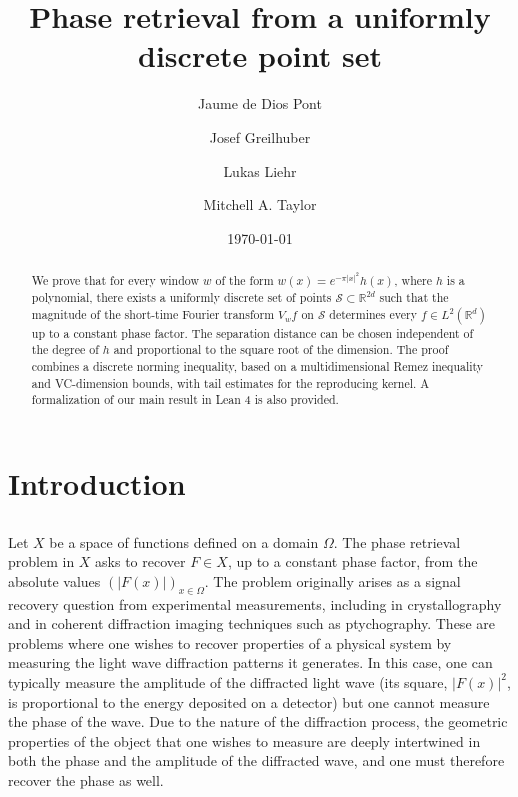 \documentclass[11pt]{amsart}
\title{Phase retrieval from a uniformly discrete point set}
\author[Jaume de Dios Pont]{Jaume de Dios Pont}
\author[Josef Greilhuber]{Josef Greilhuber}
\author[Lukas Liehr]{Lukas Liehr}
\author[Mitchell A. Taylor]{Mitchell A. Taylor}
\date{\today}
\begin{document}
\begin{abstract}
We prove that for every window $w$ of the form $w(x) = e^{-\pi |x|^2} h(x)$, where $h$ is a polynomial, there exists a uniformly discrete set of points $\mathcal{S} \subset \mathbb R^{2d}$ such that the magnitude of the short-time Fourier transform $V_w f$ on $\mathcal{S}$ determines every $f \in L^2(\mathbb R^d)$ up to a constant phase factor. The separation distance can be chosen independent of the degree of $h$ and proportional to the square root of the dimension. The proof combines a discrete norming inequality, based on a multidimensional Remez inequality and VC-dimension bounds, with tail estimates for the reproducing kernel. A formalization of our main result in Lean 4 is also provided.
\end{abstract}


\maketitle

\section{Introduction}

\label{sec:introduction}


\subsection{}


Let $X$ be a space of functions defined on a domain $\Omega$. 
The phase retrieval problem in $X$ asks to recover $F \in X$, up to a constant phase factor, from the absolute values $(|F(x)|)_{x \in \Omega}$. 
The problem originally arises as a signal recovery question from experimental measurements, including in crystallography and in coherent diffraction imaging techniques such as ptychography. 
These are problems where one wishes to recover properties of a physical system by measuring the light wave diffraction patterns it generates. 
In this case, one can typically measure the amplitude of the diffracted light wave (its square, $|F(x)|^2$, is proportional to the energy deposited on a detector) but one cannot measure the phase of the wave. 
Due to the nature of the diffraction process, the geometric properties of the object that one wishes to measure are deeply intertwined in both the phase and the amplitude of the diffracted wave, and one must therefore recover the phase as well.  
\end{document}
